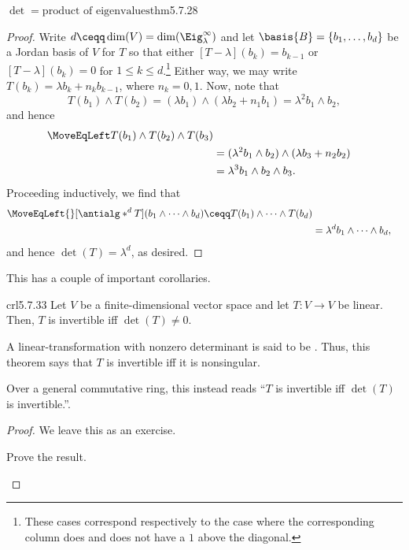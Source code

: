 \begin{thm}{$\det =\text{product of eigenvalues}$}{thm5.7.28}
\begin{proof}
		Write $d\ceqq \dim (V)=\dim (\Eig _{\lambda}^{\infty})$ and let $\basis{B}=\{ b_1,\ldots ,b_d\}$ be a Jordan basis of $V$ for $T$ so that either $[T-\lambda ](b_k)=b_{k-1}$ or $[T-\lambda ](b_k)=0$ for $1\leq k\leq d$.\footnote{These cases correspond respectively to the case where the corresponding column does and does not have a $1$ above the diagonal.}  Either way, we may write $T(b_k)=\lambda b_k+n_kb_{k-1}$, where $n_k=0,1$.  Now, note that
		\begin{equation}
			T(b_1)\wedge T(b_2)=(\lambda b_1)\wedge (\lambda b_2+n_1b_1)=\lambda ^2b_1\wedge b_2,
		\end{equation}
		and hence
		\begin{equation}
			\begin{split}
				\MoveEqLeft
				T(b_1)\wedge T(b_2)\wedge T(b_3) \\
				& =(\lambda ^2b_1\wedge b_2)\wedge (\lambda b_3+n_2b_2) \\
				& =\lambda ^3b_1\wedge b_2\wedge b_3.
			\end{split}
		\end{equation}
		Proceeding inductively, we find that
		\begin{equation}
			\begin{split}
				\MoveEqLeft {}
				[\antialg* ^dT](b_1\wedge \cdots \wedge b_d)\ceqq T(b_1)\wedge \cdots \wedge T(b_d) \\
				& =\lambda ^db_1\wedge \cdots \wedge b_d,
			\end{split}
		\end{equation}
		and hence $\det (T)=\lambda ^d$, as desired.
	\end{proof}
\end{thm}
This has a couple of important corollaries.
\begin{crl}{}{crl5.7.33}
	Let $V$ be a finite-dimensional vector space and let $T\colon V\rightarrow V$ be linear.  Then, $T$ is invertible iff $\det (T)\neq 0$.
	\begin{rmk}
		A linear-transformation with nonzero determinant is said to be .  Thus, this theorem says that $T$ is invertible iff it is nonsingular.
	\end{rmk}
	\begin{rmk}
		Over a general commutative ring, this instead reads ``$T$ is invertible iff $\det (T)$ is invertible.''.
	\end{rmk}
	\begin{proof}
		We leave this as an exercise.
		\begin{exr}[breakable=false]{}{}
			Prove the result.
		\end{exr}
	\end{proof}
\end{crl}
